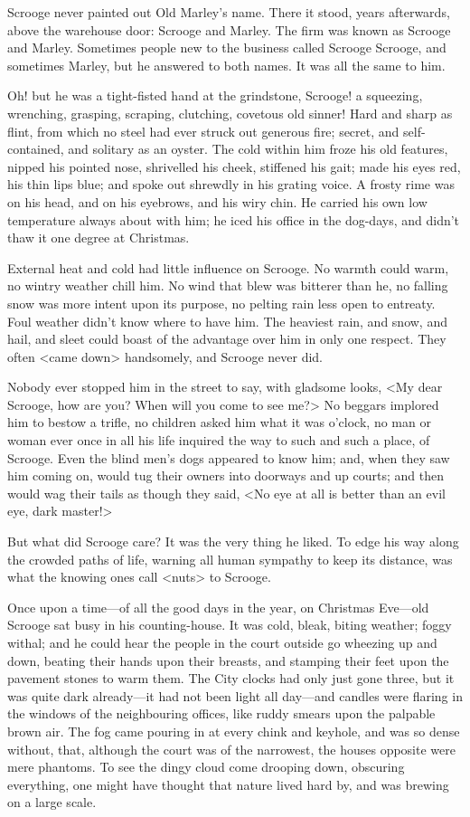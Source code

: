 Scrooge never painted out Old Marley's name. There it stood, years afterwards,
above the warehouse door: Scrooge and Marley. The firm was known as Scrooge and
Marley. Sometimes people new to the business called Scrooge Scrooge, and
sometimes Marley, but he answered to both names. It was all the same to him.

Oh! but he was a tight-fisted hand at the grindstone, Scrooge! a squeezing,
wrenching, grasping, scraping, clutching, covetous old sinner! Hard and sharp as
flint, from which no steel had ever struck out generous fire; secret, and
self-contained, and solitary as an oyster. The cold within him froze his old
features, nipped his pointed nose, shrivelled his cheek, stiffened his gait;
made his eyes red, his thin lips blue; and spoke out shrewdly in his grating
voice. A frosty rime was on his head, and on his eyebrows, and his wiry chin. He
carried his own low temperature always about with him; he iced his office in the
dog-days, and didn't thaw it one degree at Christmas.

External heat and cold had little influence on Scrooge. No warmth could warm, no
wintry weather chill him. No wind that blew was bitterer than he, no falling
snow was more intent upon its purpose, no pelting rain less open to entreaty.
Foul weather didn't know where to have him. The heaviest rain, and snow, and
hail, and sleet could boast of the advantage over him in only one respect. They
often <came down> handsomely, and Scrooge never did.

Nobody ever stopped him in the street to say, with gladsome looks, <My dear
Scrooge, how are you? When will you come to see me?> No beggars implored him to
bestow a trifle, no children asked him what it was o'clock, no man or woman ever
once in all his life inquired the way to such and such a place, of Scrooge. Even
the blind men's dogs appeared to know him; and, when they saw him coming on,
would tug their owners into doorways and up courts; and then would wag their
tails as though they said, <No eye at all is better than an evil eye, dark
master!>

But what did Scrooge care? It was the very thing he liked. To edge his way along
the crowd\-ed paths of life, warning all human sympathy to keep its distance, was
what the knowing ones call <nuts> to Scrooge.

Once upon a time—of all the good days in the year, on Christmas Eve—old Scrooge
sat busy in his counting-house. It was cold, bleak, biting weather; foggy
withal; and he could hear the people in the court outside go wheezing up and
down, beating their hands upon their breasts, and stamping their feet upon the
pavement stones to warm them. The City clocks had only just gone three, but it
was quite dark already—it had not been light all day—and candles were flaring in
the windows of the neighbouring offices, like ruddy smears upon the palpable
brown air. The fog came pouring in at every chink and keyhole, and was so dense
without, that, although the court was of the narrowest, the houses opposite were
mere phantoms. To see the dingy cloud come drooping down, obscuring everything,
one might have thought that nature lived hard by, and was brewing on a large
scale.

